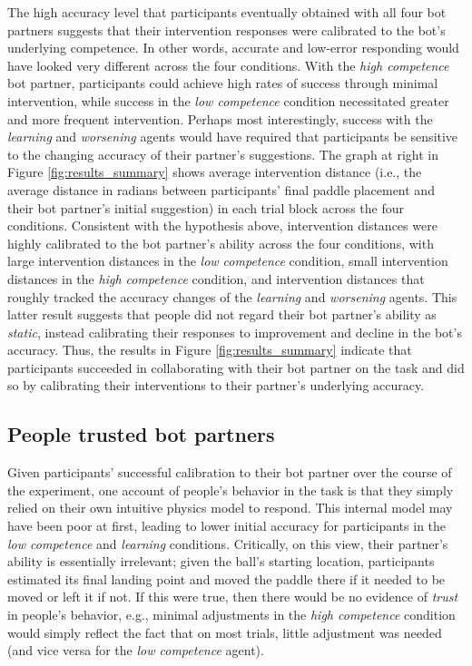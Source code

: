 \documentclass[10pt,letterpaper]{article}
\begin{document}
The high accuracy level that participants eventually obtained with all four bot partners suggests that their intervention responses were calibrated to the bot's underlying competence. In other words, accurate and low-error responding would have looked very different across the four conditions. With the \textit{high competence} bot partner, participants could achieve high rates of success through minimal intervention, while success in the \textit{low competence} condition necessitated greater and more frequent intervention. Perhaps most interestingly, success with the \textit{learning} and \textit{worsening} agents would have required that participants be sensitive to the changing accuracy of their partner's suggestions. The graph at right in Figure \ref{fig:results_summary} shows average intervention distance (i.e., the average distance in radians between participants' final paddle placement and their bot partner's initial suggestion) in each trial block across the four conditions. Consistent with the hypothesis above, intervention distances were highly calibrated to the bot partner's ability across the four conditions, with large intervention distances in the \textit{low competence} condition, small intervention distances in the \textit{high competence} condition, and intervention distances that roughly tracked the accuracy changes of the \textit{learning} and \textit{worsening} agents. This latter result suggests that people did not regard their bot partner's ability as \textit{static}, instead calibrating their responses to improvement and decline in the bot's accuracy. Thus, the results in Figure \ref{fig:results_summary} indicate that participants succeeded in collaborating with their bot partner on the task and did so by calibrating their interventions to their partner's underlying accuracy.


\subsection{People trusted bot partners}

Given participants' successful calibration to their bot partner over the course of the experiment, one account of people's behavior in the task is that they simply relied on their own intuitive physics model to respond. This internal model may have been poor at first, leading to lower initial accuracy for participants in the \textit{low competence} and \textit{learning} conditions. Critically, on this view, their partner's ability is essentially irrelevant; given the ball's starting location, participants estimated its final landing point and moved the paddle there if it needed to be moved or left it if not. If this were true, then there would be no evidence of \textit{trust} in people's behavior, e.g., minimal adjustments in the \textit{high competence} condition would simply reflect the fact that on most trials, little adjustment was needed (and vice versa for the \textit{low competence} agent). 
\end{document}
